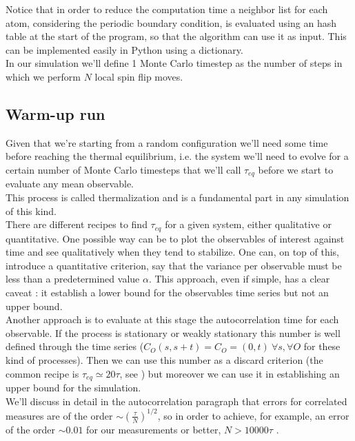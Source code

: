Notice that in order to reduce the computation time a neighbor list for each atom, considering the periodic boundary condition, 
is evaluated using an hash table at the start of the program, so that the algorithm can use it as input. This can be implemented
 easily in Python using a dictionary. \\
In our simulation we'll define 1 Monte Carlo timestep as the number of steps in which we perform $N$ local spin flip moves. \\

\subsection{Warm-up run} 
Given that we're starting from a random configuration we'll need some time before reaching the thermal equilibrium, 
i.e. the system we'll need to evolve for a certain number of Monte Carlo timesteps that we'll call $\tau_{eq}$ before we start to evaluate any mean observable. \\
This process is called thermalization and is a fundamental part in any simulation of this kind. \\
There are different recipes to find $\tau_{eq}$ for a given system, either qualitative or quantitative. One possible way can be to plot the
observables of interest against time and see qualitatively when they tend to stabilize. One can, on top of this, introduce a quantitative criterion,
say that the variance per observable must be less than a predetermined value $\alpha$. This approach, even if simple, has a clear caveat : it establish a lower
bound for the observables time series but not an upper bound. \\
Another approach is to evaluate at this stage the autocorrelation time for each observable. If the process is stationary or weakly stationary this number is 
well defined through the time series ($C_O(s, s+t) = C_O=(0, t)\ \forall s, \forall O$ for these kind of processes). Then we can use this number as a discard criterion 
(the common recipe is $\tau_{eq} \simeq 20 \tau$, see \cite{Sokal1997}) but moreover we can use it in establishing an upper bound for the simulation. \\
We'll discuss in detail in the autocorrelation paragraph that errors for correlated measures are of the order $\sim (\frac{\tau}{N})^{1/2}$, so in order to 
achieve, for example, an error of the order $ \sim 0.01$ for our measurements or better, $N > 10000\tau$ . \\

